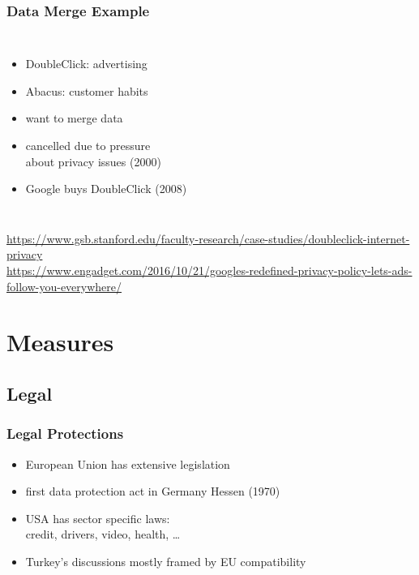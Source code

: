 \documentclass[dvipsnames]{beamer}
\theoremstyle{plain}
\begin{document}
\begin{frame}
  \frametitle{Data Merge Example}

  \begin{columns}

    \begin{itemize}
      \item DoubleClick: advertising
      \item Abacus: customer habits
      \item want to merge data
      \item cancelled due to pressure\\
        about privacy issues (2000)

      \pause
      \medskip
      \item Google buys DoubleClick (2008)
    \end{itemize}
  \end{columns}

  \medskip
  \tiny{\url{https://www.gsb.stanford.edu/faculty-research/case-studies/doubleclick-internet-privacy}}\\
  \smallskip
  \tiny{\url{https://www.engadget.com/2016/10/21/googles-redefined-privacy-policy-lets-ads-follow-you-everywhere/}}\\
\end{frame}

\section{Measures}

\subsection{Legal}

\begin{frame}
  \frametitle{Legal Protections}

  \begin{itemize}
    \item European Union has extensive legislation
    \item first data protection act in Germany Hessen (1970)

    \medskip
    \item USA has sector specific laws:\\
      credit, drivers, video, health, \ldots

    \medskip
    \item Turkey's discussions mostly framed by EU compatibility
  \end{itemize}
\end{frame}
\end{document}
